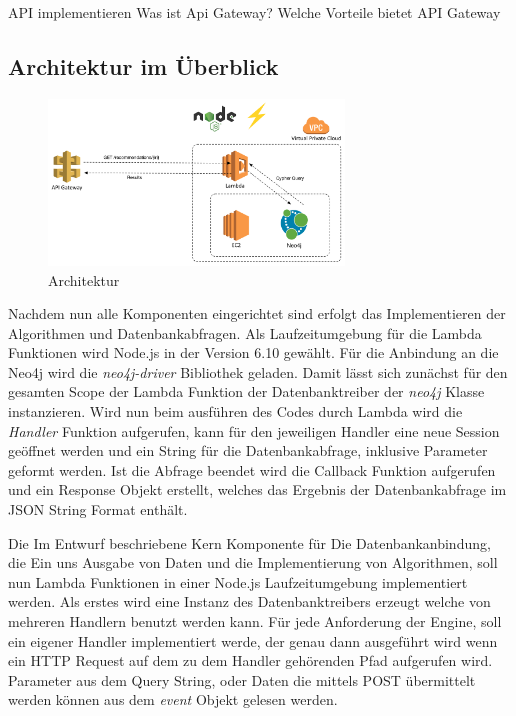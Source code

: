 API implementieren
Was ist Api Gateway?
Welche Vorteile bietet API Gateway


\subsection{Architektur im Überblick}

\begin{figure}[htb]
 \centering
 \includegraphics[width=0.7\textwidth,angle=0]{abb/Architecture}
 \caption[Beschreibung]{Architektur}
\label{fig:Architektur}
\end{figure}

Nachdem nun alle Komponenten eingerichtet sind erfolgt das Implementieren der Algorithmen und Datenbankabfragen. Als Laufzeitumgebung für die Lambda Funktionen wird Node.js in der Version 6.10 gewählt. Für die Anbindung an die Neo4j wird die \textit{neo4j-driver} Bibliothek geladen. Damit lässt sich zunächst für den gesamten Scope der Lambda Funktion der Datenbanktreiber der \textit{neo4j} Klasse instanzieren. 
Wird nun beim ausführen des Codes durch Lambda wird die \textit{Handler} Funktion aufgerufen, kann für den jeweiligen Handler eine neue Session geöffnet werden und ein String für die Datenbankabfrage, inklusive Parameter geformt werden. Ist die Abfrage beendet wird die Callback Funktion aufgerufen und ein Response Objekt erstellt, welches das Ergebnis der Datenbankabfrage im JSON String Format enthält.

Die Im Entwurf beschriebene Kern Komponente für Die Datenbankanbindung, die Ein uns Ausgabe von Daten und die Implementierung von Algorithmen, soll nun Lambda Funktionen in einer Node.js Laufzeitumgebung implementiert werden. Als erstes wird eine Instanz des Datenbanktreibers erzeugt welche von mehreren Handlern benutzt werden kann. Für jede Anforderung der Engine, soll ein eigener Handler implementiert werde, der genau dann ausgeführt wird wenn ein HTTP Request auf dem zu dem Handler gehörenden Pfad aufgerufen wird. Parameter aus dem Query String, oder Daten die mittels POST übermittelt werden können aus dem \textit{event} Objekt gelesen werden. 

